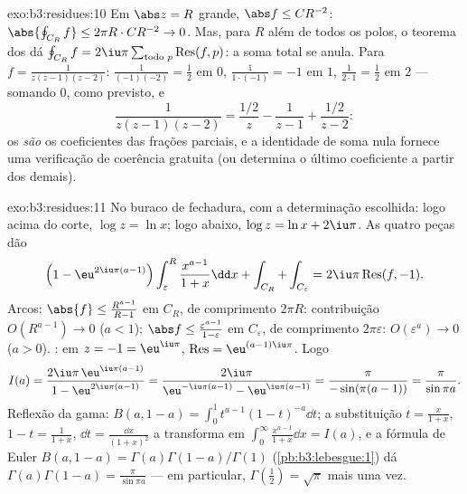 \begin{solution}{exo:b3:residues:10}
Em $\abs z = R$ grande, $\abs f \leq C R^{-2}$: $\abs{\oint_{C_R}
f} \leq 2\pi R\cdot CR^{-2} \to 0$. Mas, para $R$ além de todos os
polos, o teorema dos  dá $\oint_{C_R}f =
2\iu\pi\sum_{\text{todo }p}\operatorname{Res}(f, p)$: a soma
total se anula. Para $f = \frac1{z(z-1)(z-2)}$: 
$\frac1{(-1)(-2)} = \frac12$ em $0$, $\frac1{1\cdot(-1)} = -1$
em $1$, $\frac1{2\cdot1} = \frac12$ em $2$ --- somando $0$,
como previsto, e
\[
\frac1{z(z-1)(z-2)} = \frac{1/2}{z} - \frac1{z - 1} +
\frac{1/2}{z-2} :
\]
os  \emph{são} os coeficientes das frações parciais, e
a identidade de soma nula fornece uma verificação de coerência gratuita (ou
determina o último coeficiente a partir dos demais).
\end{solution}

\begin{solution}{exo:b3:residues:11}
No buraco de fechadura, com a determinação escolhida:
logo acima do corte, $\log z = \ln x$; logo abaixo, $\log z =
\ln x + 2\iu\pi$. As quatro peças dão
\[
\Bigl(1 - \eu^{2\iu\pi(a-1)}\Bigr)\int_\varepsilon^R
\frac{x^{a-1}}{1+x}\dd x + \int_{C_R} + \int_{C_\varepsilon}
= 2\iu\pi\operatorname{Res}(f, -1) .
\]
Arcos: $\abs{f} \leq \frac{R^{a-1}}{R - 1}$ em $C_R$, de comprimento
$2\pi R$: contribuição $O(R^{a-1}) \to 0$ ($a < 1$);
$\abs f \leq \frac{\varepsilon^{a-1}}{1 - \varepsilon}$ em
$C_\varepsilon$, de comprimento $2\pi\varepsilon$: $O(\varepsilon^a)
\to 0$ ($a > 0$). : em $z = -1 = \eu^{\iu\pi}$,
$\operatorname{Res} = \eu^{(a-1)\iu\pi}$. Logo
\[
I(a) = \frac{2\iu\pi\,\eu^{\iu\pi(a-1)}}{1 -
\eu^{2\iu\pi(a-1)}}
= \frac{2\iu\pi}{\eu^{-\iu\pi(a-1)} - \eu^{\iu\pi(a-1)}}
= \frac{\pi}{-\sin(\pi(a-1))} = \frac{\pi}{\sin\pi a} .
\]
Reflexão da gama: $B(a, 1-a) =
\int_0^1t^{a-1}(1-t)^{-a}\dd t$; a substituição $t =
\frac x{1+x}$, $1 - t = \frac1{1+x}$, $\dd t =
\frac{\dd x}{(1+x)^2}$ a transforma em $\int_0^\infty
\frac{x^{a-1}}{1+x}\dd x = I(a)$, e a fórmula de Euler
$B(a, 1-a) = \Gamma(a)\Gamma(1-a)/\Gamma(1) $
(\cref{pb:b3:lebesgue:1}) dá
$\Gamma(a)\Gamma(1-a) = \frac\pi{\sin\pi a}$ --- em
particular, $\Gamma(\tfrac12) = \sqrt\pi$ mais uma vez.

\end{solution}

